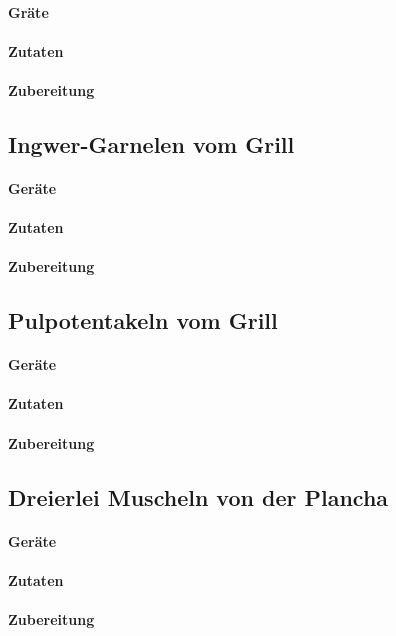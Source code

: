 \paragraph{Gräte}

\paragraph{Zutaten}

\paragraph{Zubereitung}


\subsection{Ingwer-Garnelen vom Grill}

\paragraph{Geräte}

\paragraph{Zutaten}

\paragraph{Zubereitung}


\subsection{Pulpotentakeln vom Grill}

\paragraph{Geräte}

\paragraph{Zutaten}

\paragraph{Zubereitung}


\subsection{Dreierlei Muscheln von der Plancha}

\paragraph{Geräte}

\paragraph{Zutaten}

\paragraph{Zubereitung}